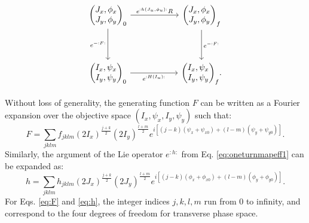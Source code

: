 \begin{equation}\begin{tikzcd}
	{\begin{pmatrix} J_x,\phi_x \\ J_y,\phi_y \end{pmatrix}_0} & {} & {\begin{pmatrix} J_x,\phi_x \\ J_y,\phi_y \end{pmatrix}_{f}} \\
	\\
	{\begin{pmatrix} I_x,\psi_x \\ I_y,\psi_y \end{pmatrix}_0} && {\begin{pmatrix} I_x,\psi_x \\ I_y,\psi_y \end{pmatrix}_{f}}
	\arrow["{e^{:h(J_u,\phi_u):}R}", from=1-1, to=1-3]
	\arrow["{e^{-:F:}}"', from=1-1, to=3-1]
	\arrow["{e^{:H(I_u):}}"', from=3-1, to=3-3]
	\arrow["{e^{-:F:}}", from=1-3, to=3-3]
    .
\end{tikzcd}\end{equation}

Without loss of generality, the generating function $F$ can be written as a Fourier expansion over the objective space $(I_x,\psi_x,I_y,\psi_y)$ such that:
\begin{equation}
    \label{eq:F}
    F=\sum_{jklm} f_{jklm} \left( 2 I_x\right)^{\frac{j+k}{2}} \left( 2 I_y\right)^{\frac{l+m}{2}} e^{i\left[ \left( j-k \right)\left( \psi_x+\psi_{x0} \right)+ \left( l-m \right) \left( \psi_y+\psi_{y0} \right)\right]}.
\end{equation}
Similarly, the argument of the Lie operator $e^{:h:}$ from Eq. \ref{eq:oneturnmapeff1} can be expanded as:
\begin{equation}
    \label{eq:h}
    h=\sum_{jklm} h_{jklm} \left( 2 J_x\right)^{\frac{j+k}{2}} \left( 2 J_y\right)^{\frac{l+m}{2}} e^{i\left[ \left( j-k \right)\left( \phi_x+\phi_{x0} \right)+ \left( l-m \right) \left( \phi_y+\phi_{y0} \right)\right]}.
\end{equation}
For Eqs. \ref{eq:F} and \ref{eq:h}, the integer indices $j,k,l,m$ run from $0$ to infinity, and correspond to the four degrees of freedom for transverse phase space.   

